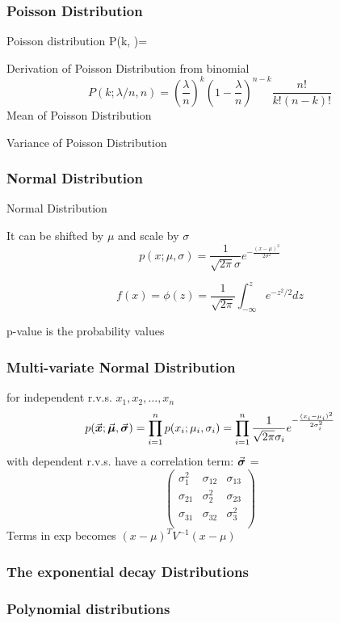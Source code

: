 \documentclass[12pt,a4paper]{article}
\begin{document}
\subsubsection{Poisson Distribution}
\begin{definition}
    {Poisson distribution}
    {P(k, \lambda)=}
    {}
\end{definition}
Derivation of Poisson Distribution from binomial
$$
P(k ; \lambda / n, n)=\left(\frac{\lambda}{n}\right)^k\left(1-\frac{\lambda}{n}\right)^{n-k} \frac{n !}{k !(n-k) !}
$$
Mean of Poisson Distribution

Variance of Poisson Distribution

\subsubsection{Normal Distribution}
\begin{definition}
    {Normal Distribution}{}{}
\end{definition}
It can be shifted by $\mu$ and scale by $\sigma$
$$
p(x;\mu, \sigma)=\frac{1}{\sqrt{2 \pi} \sigma} e^{-\frac{(x-\mu)^2}{2 \sigma^2}}
$$

$$
f(x) = \phi(z) = \frac{1}{\sqrt{2\pi}}\int^z_{-\infty}{e^{-z^2/2} dz}
$$

p-value is the probability values
\subsubsection{Multi-variate Normal Distribution}
for independent r.v.s. $x_1, x_2, \ldots, x_n$ 
$$
p(\va*{x};\va*{\mu},\va*{\sigma}) = \prod_{i=1}^n p(x_i;\mu_i,\sigma_i) = \prod_{i=1}^n \frac{1}{\sqrt{2 \pi} \sigma_i} e^{-\frac{(x_i-\mu_i)^2}{2 \sigma_i^2}}
$$
with dependent r.v.s. have a correlation term:
$\va*{\sigma}$ = 
$$
\begin{pmatrix}
    \sigma_1^2 & \sigma_{12} & \sigma_{13} \\
    \sigma_{21} & \sigma_2^2 & \sigma_{23} \\
    \sigma_{31} & \sigma_{32} & \sigma_3^2 \\
\end{pmatrix}
$$
Terms in exp becomes
$(x-\mu)^T V^{-1} (x-\mu)$
\subsubsection{The exponential decay Distributions}
\subsubsection{Polynomial distributions}
\end{document}
